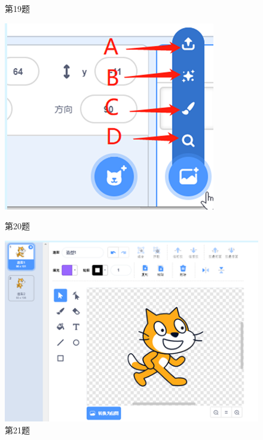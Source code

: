 \documentclass[10.5pt, a4paper]{article}
\begin{document}
\begin{enumerate}
\begin{figure}[htbp]
\begin{minipage}[t]{.21\textwidth}
                \caption*{第19题}
            \end{minipage}
            \begin{minipage}[t]{.23\textwidth}
                \centering
                \includegraphics[width=\textwidth]{20.png}
                \caption*{第20题}
            \end{minipage}
            \begin{minipage}[t]{.27\textwidth}
                \centering
                \includegraphics[width=\textwidth]{21.png}
                \caption*{第21题}
            \end{minipage}
        \end{figure}


\end{enumerate}
\end{document}
